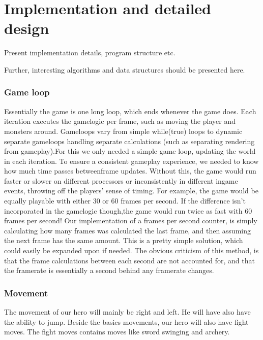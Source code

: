 \chapter{Implementation and detailed design}

Present implementation details, program structure etc.

Further, interesting algorithms and data structures should be presented here.

\subsection{Game loop}
Essentially the game is one long loop, which ends whenever the game does.
Each iteration executes the gamelogic per frame, such as moving the player
and monsters around. Gameloops vary from simple while(true) loops to dynamic
separate gameloops handling separate calculations (such as separating rendering
from gameplay).For this we only needed a simple game loop, updating the world in
each iteration. To ensure a consistent gameplay experience, we needed to know how
much time passes betweenframe updates. Without this, the game would run faster
or slower on different processors or inconsistently in different ingame events,
throwing off the players’ sense of timing. For example, the game would be equally
playable with either 30 or 60 frames per second. If the difference isn’t incorporated
in the gamelogic though,the game would run twice as fast with 60 frames per second!
Our implementation of a frames per second counter, is simply calculating how many
frames was calculated the last frame, and then assuming the next frame has the same
amount. This is a pretty simple solution, which could easily be expanded upon if needed.
The obvious criticism of this method, is that the frame calculations between each second
are not accounted for, and that the framerate is essentially a second behind any
framerate changes.

\subsection{Movement}
The movement of our hero will mainly be right and left.
He will have also have the ability to jump. Beside the basics movements,
our hero will also have fight moves. The fight moves contains moves like
sword swinging and archery.

